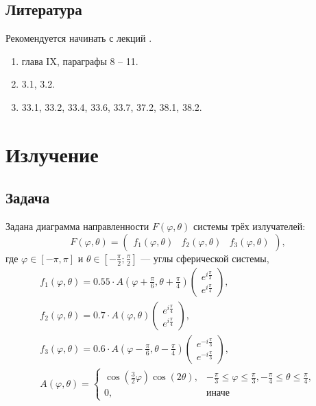\documentclass[a4paper,12pt]{article}
\begin{document}
\subsection{Литература}

Рекомендуется начинать с лекций \cite{Tyrtyshnikov}.

\begin{enumerate}
    \item [\cite{Gantmacher}] глава IX, параграфы 8 -- 11.
    \item [\cite{Lancaster}] 3.1, 3.2.
    \item [\cite{Tyrtyshnikov}] 33.1, 33.2, 33.4, 33.6, 33.7, 37.2, 38.1, 38.2.
\end{enumerate}

\section{Излучение}

\subsection{Задача}

Задана диаграмма направленности $F(\varphi, \theta)$ системы трёх излучателей:
\[
    F(\varphi, \theta)
    = \begin{pmatrix}
        f_1(\varphi, \theta) & f_2(\varphi, \theta) & f_3(\varphi, \theta)
    \end{pmatrix} ,
\]
где $\varphi \in [ -\pi, \pi]$ и $\theta \in \left[ -\frac{\pi}{2} ; \frac{\pi}{2} \right]$ --- углы сферической системы,
\begin{gather*}
    f_1(\varphi, \theta) =
    0.55 \cdot A \left( \varphi + \frac{\pi}{6}, \theta + \frac{\pi}{4} \right)
    \begin{pmatrix}
        e^{i \frac{\pi}{3}} \\
        e^{i \frac{\pi}{4}}
    \end{pmatrix}, \\
    f_2(\varphi, \theta) =
    0.7 \cdot A \left( \varphi, \theta \right)
    \begin{pmatrix}
        e^{i \frac{\pi}{4}} \\
        e^{i \frac{\pi}{4}}
    \end{pmatrix}, \\
    f_3(\varphi, \theta) =
    0.6 \cdot A \left( \varphi - \frac{\pi}{6}, \theta - \frac{\pi}{4} \right)
    \begin{pmatrix}
        e^{-i \frac{\pi}{3}} \\
        e^{-i \frac{\pi}{3}}
    \end{pmatrix} , \\
    A \left( \varphi, \theta \right)
    =
    \left \{
    \begin{array}{ll}
        \cos \left( \frac{3}{2} \varphi \right) \cos \left( 2 \theta \right), & -\frac{\pi}{3} \le \varphi \le \frac{\pi}{3}, -\frac{\pi}{4} \le \theta \le \frac{\pi}{4}, \\
        0,                                                                    & \text{иначе}
    \end{array}
    \right .
\end{gather*}
\end{document}
